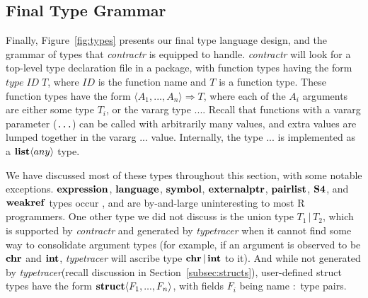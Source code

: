 \documentclass[acmsmall,review,anonymous]{acmart}\settopmatter{printfolios=true,printccs=false,printacmref=false}
\newcommand{\code}[1]{{\lstinline[style=Rin]!#1!}\xspace}
\newcommand{\contractr}{\emph{contractr}\xspace} %
\newcommand{\typetracer}{\emph{typetracer}\xspace} %
\begin{document}
%
%
%
%
\subsection{Final Type Grammar}

Finally, Figure~\ref{fig:types} presents our final type language design, and
the grammar of types that \contractr is equipped to handle.  \contractr will
look for a top-level type declaration file in a package, with function types
having the form $type \; ID \; T$, where $ID$ is the function name and $T$
is a function type.  These function types have the form $\langle A_1 , ...,
A_n\rangle \Rightarrow T$, where each of the $A_i$ arguments are either some
type $T_i$, or the vararg type $...$.  Recall that functions with a vararg
parameter (\code{...}) can be called with arbitrarily many values, and extra
values are lumped together in the vararg $...$ value.  Internally, the type
$...$ is implemented as a ${\bf list} \langle any \rangle$ type.

We have discussed most of these types throughout this section, with some
notable exceptions.  ${\bf expression}$, ${\bf language}$, ${\bf symbol}$,
${\bf externalptr}$, ${\bf pairlist}$, ${\bf S4}$, and ${\bf weakref}$ types
occur , and are by-and-large uninteresting to most R programmers.
  One other type we did not
discuss is the union type $T_1 \, | \, T_2$, which is supported by
\contractr and generated by \typetracer when it cannot find some way to
consolidate argument types (for example, if an argument is observed to be
${\bf chr}$ and ${\bf int}$, \typetracer will ascribe type ${\bf chr} \, |
\, {\bf int}$ to it).  And while not generated by \typetracer (recall
discussion in Section~\ref{subsec:structs}), user-defined struct types have
the form ${\bf struct}\langle F_1, ..., F_n \rangle$, with fields $F_i$
being name $:$ type pairs.

\label{subsec:typegrammar}
\end{document}
